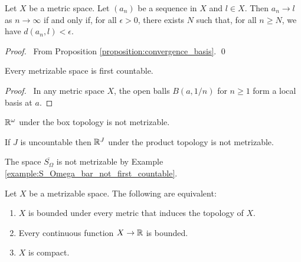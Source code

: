 \begin{proposition}
    \label{proposition:convergence_metric}
    Let $X$ be a metric space. Let $(a_n)$ be a sequence in $X$ and $l \in X$.
    Then $a_n \rightarrow l$ as $n \rightarrow \infty$ if and only if,
    for all $\epsilon > 0$, there exists $N$ such that, for all $n \geq N$,
    we have $d(a_n, l) < \epsilon$.
\end{proposition}

\begin{proof}
    \pf\ From Proposition \ref{proposition:convergence_basis}. \qed
\end{proof}

\begin{proposition}
    Every metrizable space is first countable.
\end{proposition}

\begin{proof}
    \pf\ In any metric space $X$, the open balls $B(a,1/n)$ for $n \geq 1$ form a local basis at $a$.
\end{proof}

\begin{example}
    $\mathbb{R}^\omega$ under the box topology is not metrizable.
\end{example}

\begin{example}
    If $J$ is uncountable then $\mathbb{R}^J$ under the product topology is not metrizable.
\end{example}

\begin{example}
    The space $\overline{S_\Omega}$ is not metrizable by Example \ref{example:S_Omega_bar_not_first_countable}.
\end{example}

\begin{proposition}[Choice]
    Let $X$ be a metrizable space. The following are equivalent:
    \begin{enumerate}
        \item $X$ is bounded under every metric that induces the topology of $X$.
        \item Every continuous function $X \rightarrow \mathbb{R}$ is bounded.
        \item $X$ is compact.
    \end{enumerate}
\end{proposition}

